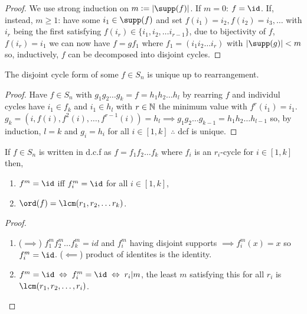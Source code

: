 \documentclass[../Year1.tex]{subfiles}
\begin{document}
\begin{proof}
    We use strong induction on $m:=|\supp(f)|$. If $m=0$: $f=\id$. If, instead, $m\geq1$: have some $i_1\in\supp(f)$ and set $f(i_1)=i_2,f(i_2)=i_3,\ldots$ with $i_r$ being the first satisfying $f(i_r)\in\{i_1,i_2,\ldots i_{r-1}\}$, due to bijectivity of $f$, $f(i_r)=i_1$ we can now have $f=gf_1$ where $f_1=(i_1i_2\ldots i_r)$ with $|\supp(g)|<m$ so, inductively, $f$ can be decomposed into disjoint cycles.
\end{proof}

\begin{theorem}
    The disjoint cycle form of some $f\in S_n$ is unique up to rearrangement.
\end{theorem}

\begin{proof}
    Have $f\in S_n$ with $g_1g_2\ldots g_k=f=h_1h_2\ldots h_l$ by rearring $f$ and individul cycles have $i_1\in f_k$ and $i_1\in h_l$ with $r\in\mathbb{N}$ the minimum value with $f^r(i_1)=i_1$. $g_k=(i,f(i),f^2(i),\ldots,f^{r-1}(i))=h_l \implies g_1g_2\ldots g_{k-1}=h_1h_2\ldots h_{l-1}$ so, by induction, $l=k$ and $g_i=h_i$ for all $i\in[1,k]$  $\therefore$ dcf is unique. 
\end{proof}

\begin{theorem}
    If $f\in S_n$ is written in d.c.f as $f=f_1f_2\ldots f_k$ where $f_i$ is an $r_i$-cycle for $i\in[1,k]$ then, \begin{enumerate}
        \item $f^m=\id$ iff $f_i^m=\id$ for all $i\in[1,k]$,
        \item $\ord(f) = \lcm(r_1,r_2,\ldots r_k)$.
    \end{enumerate}
\end{theorem}

\begin{proof}
    \begin{enumerate}
        \item ($\implies$) $f_1^m f_2^m\ldots f_k^m=id$ and $f_i^m$ having disjoint supports $\implies f_i^m(x)=x$ so $f_i^m=\id$. ($\impliedby$) product of identites is the identity.
        \item $f^m=\id\iff f_i^m=\id\iff r_i|m$, the least $m$ satisfying this for all $r_i$ is $\lcm(r_1,r_2,\ldots,r_i)$.\vspace{-10pt}
    \end{enumerate}
\end{proof}
\end{document}
